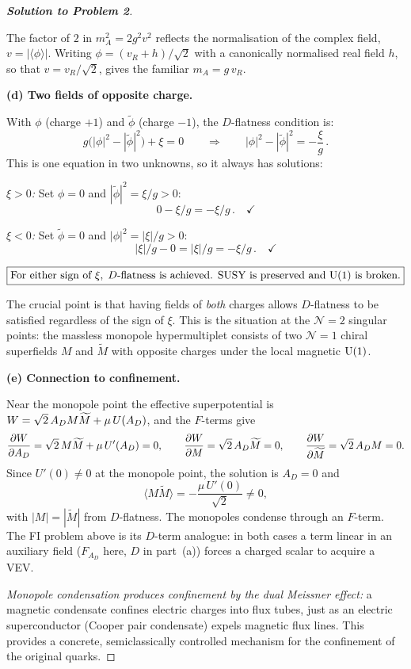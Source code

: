 \documentclass[11pt,a4paper]{article}
\begin{document}
\begin{proof}[\textbf{Solution to Problem 2}]
\begin{remark}[Factor of 2]
  The factor of $2$ in $m_A^2 = 2g^2 v^2$ reflects the normalisation of
  the complex field, $v = |\langle\phi\rangle|$.  Writing
  $\phi = (v_R + h)/\sqrt{2}$ with a canonically normalised real field
  $h$, so that $v = v_R/\sqrt{2}$, gives the familiar $m_A = g\,v_R$.
\end{remark}

\bigskip

\textbf{(d) Two fields of opposite charge.}

With $\phi$ (charge $+1$) and $\tilde\phi$ (charge $-1$), the
$D$-flatness condition is:
\[
  g\bigl(|\phi|^2 - |\tilde\phi|^2\bigr) + \xi = 0
  \qquad\Longrightarrow\qquad
  |\phi|^2 - |\tilde\phi|^2 = -\frac{\xi}{g}\,.
\]
This is one equation in two unknowns, so it always has solutions:

\textit{$\xi > 0$:}  Set $\phi = 0$ and $|\tilde\phi|^2 = \xi/g > 0$:
\[
  0 - \xi/g = -\xi/g\,.
  \quad\checkmark
\]

\textit{$\xi < 0$:}  Set $\tilde\phi = 0$ and $|\phi|^2 = |\xi|/g > 0$:
\[
  |\xi|/g - 0 = |\xi|/g = -\xi/g\,.
  \quad\checkmark
\]

\[
  \boxed{\text{For either sign of } \xi,\; D\text{-flatness is
  achieved.  SUSY is preserved and } \mathrm{U}(1) \text{ is broken.}}
\]

The crucial point is that having fields of \emph{both} charges allows
$D$-flatness to be satisfied regardless of the sign of $\xi$.  This is
the situation at the $\mathcal{N}=2$ singular points: the massless
monopole hypermultiplet consists of two $\mathcal{N}=1$ chiral
superfields $M$ and $\widetilde{M}$ with opposite charges under the local
magnetic $\mathrm{U}(1)$.

\bigskip

\textbf{(e) Connection to confinement.}

Near the monopole point the effective superpotential is
$W = \sqrt{2}\,A_D M\widetilde{M} + \mu\,U(A_D)$, and the
$F$-terms give
\[
  \frac{\partial W}{\partial A_D}
  = \sqrt{2}\,M\widetilde{M} + \mu\,U'(A_D) = 0,
  \qquad
  \frac{\partial W}{\partial M} = \sqrt{2}\,A_D\widetilde{M} = 0,
  \qquad
  \frac{\partial W}{\partial\widetilde{M}} = \sqrt{2}\,A_D M = 0.
\]
Since $U'(0) \neq 0$ at the monopole point, the solution is $A_D = 0$ and
\[
  \langle M\widetilde{M}\rangle = -\frac{\mu\,U'(0)}{\sqrt{2}} \neq 0,
\]
with $|M| = |\widetilde{M}|$ from $D$-flatness.  The monopoles condense
through an $F$-term.  The FI problem above is its $D$-term analogue: in
both cases a term linear in an auxiliary field ($F_{A_D}$ here, $D$ in
part~(a)) forces a charged scalar to acquire a VEV.

\textit{Monopole condensation produces confinement by the dual Meissner
effect:} a magnetic condensate confines electric charges into flux
tubes, just as an electric superconductor (Cooper pair condensate)
expels magnetic flux lines.  This provides a concrete, semiclassically
controlled mechanism for the confinement of the original quarks.

\end{proof}
\end{document}

